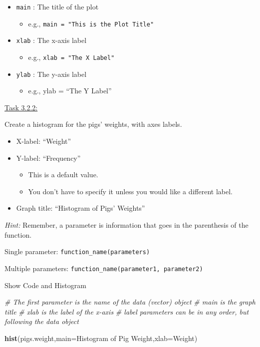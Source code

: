\documentclass[
]{article}
\newenvironment{Shaded}{\begin{snugshade}}{\end{snugshade}}
\newcommand{\AttributeTok}[1]{\textcolor[rgb]{0.13,0.29,0.53}{#1}}
\newcommand{\CommentTok}[1]{\textcolor[rgb]{0.56,0.35,0.01}{\textit{#1}}}
\newcommand{\FunctionTok}[1]{\textcolor[rgb]{0.13,0.29,0.53}{\textbf{#1}}}
\newcommand{\NormalTok}[1]{#1}
\newcommand{\StringTok}[1]{\textcolor[rgb]{0.31,0.60,0.02}{#1}}
\providecommand{\tightlist}{%
  \setlength{\itemsep}{0pt}\setlength{\parskip}{0pt}}
\begin{document}
\begin{itemize}
\item
  \texttt{main} : The title of the plot

  \begin{itemize}
  \tightlist
  \item
    e.g., \texttt{main\ =\ "This\ is\ the\ Plot\ Title"}
  \end{itemize}
\item
  \texttt{xlab} : The x-axis label

  \begin{itemize}
  \tightlist
  \item
    e.g., \texttt{xlab\ =\ "The\ X\ Label"}
  \end{itemize}
\item
  \texttt{ylab} : The y-axis label

  \begin{itemize}
  \tightlist
  \item
    e.g., ylab = ``The Y Label''
  \end{itemize}
\end{itemize}

\ul{Task 3.2.2:}

Create a histogram for the pigs' weights, with axes labels.

\begin{itemize}
\tightlist
\item
  X-label: ``Weight''
\item
  Y-label: ``Frequency''

  \begin{itemize}
  \tightlist
  \item
    This is a default value.
  \item
    You don't have to specify it unless you would like a different
    label.
  \end{itemize}
\item
  Graph title: ``Histogram of Pigs' Weights''
\end{itemize}

\emph{Hint:} Remember, a parameter is information that goes in the
parenthesis of the function.

Single parameter: \texttt{function\_name(parameters)}

Multiple parameters: \texttt{function\_name(parameter1,\ parameter2)}

Show Code and Histogram

\begin{Shaded}
\begin{Highlighting}[]
\CommentTok{\# The first parameter is the name of the data (vector) object}
\CommentTok{\# \textquotesingle{}main\textquotesingle{} is the graph title }
\CommentTok{\# \textquotesingle{}xlab\textquotesingle{} is the label of the x{-}axis}
\CommentTok{\# label parameters can be in any order, but following the data object}

\FunctionTok{hist}\NormalTok{(pigs.weight,}\AttributeTok{main=}\StringTok{\textquotesingle{}Histogram of Pig Weight\textquotesingle{}}\NormalTok{,}\AttributeTok{xlab=}\StringTok{\textquotesingle{}Weight\textquotesingle{}}\NormalTok{)}
\end{Highlighting}
\end{Shaded}
\end{document}
